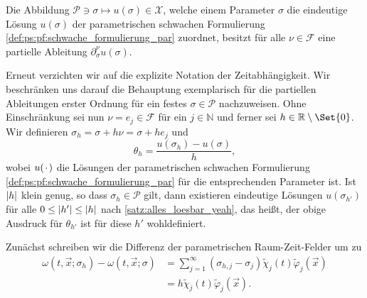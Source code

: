 \begin{Satz}
    Die Abbildung $\mathcal P \ni \sigma \mapsto u(\sigma) \in \mathcal X$, welche einem Parameter $\sigma$ die eindeutige Lösung $u(\sigma)$ der parametrischen schwachen Formulierung \cref{def:ps:pf:schwache_formulierung_par} zuordnet, besitzt für alle $\nu \in \mathcal F$ eine partielle Ableitung $\partial^{\nu}_{\sigma} u(\sigma)$.

    \begin{Beweis}
        Erneut verzichten wir auf die explizite Notation der Zeitabhängigkeit.
        Wir beschränken uns darauf die Behauptung exemplarisch für die partiellen Ableitungen erster Ordnung für ein festes $\sigma \in \mathcal P$ nachzuweisen.
        Ohne Einschränkung sei nun $\nu = e_{j} \in \mathcal F$ für ein $j \in \mathbb{N}$ und ferner sei $h \in \mathbb{R} \setminus \Set{ 0 }$.
        Wir definieren $\sigma_{h} = \sigma + h \nu = \sigma + h e_{j}$ und
        \begin{equation}
            \theta_{h} = \frac{u(\sigma_{h}) - u(\sigma)}{h},
        \end{equation}
        wobei $u({\mkern2mu\cdot\mkern2mu})$ die Lösungen der parametrischen schwachen Formulierung \eqref{def:ps:pf:schwache_formulierung_par} für die entsprechenden Parameter ist.
        Ist $\lvert h\rvert$ klein genug, so dass $\sigma_{h} \in \mathcal P$ gilt, dann existieren eindeutige Lösungen $u(\sigma_{h'})$ für alle $0 \leq \lvert h'\rvert \leq \lvert h\rvert$ nach \cref{satz:alles_loesbar_yeah}, das heißt, der obige Ausdruck für $\theta_{h'}$ ist für diese $h'$ wohldefiniert.

        Zunächst schreiben wir die Differenz der parametrischen Raum-Zeit-Felder um zu
        \begin{align}
            \omega(t, \vec{x}; \sigma_{h}) - \omega(t, \vec{x}; \sigma)
            &= \sum_{j = 1}^{\infty} (\sigma_{h,j} - \sigma_{j} ) \tilde{\chi}_{j}(t) \tilde{\varphi}_{j}(\vec{x})
            \\&= h \tilde{\chi}_{j}(t) \tilde{\varphi}_{j}(\vec{x}).
        \end{align}


\end{Beweis}
\end{Satz}
